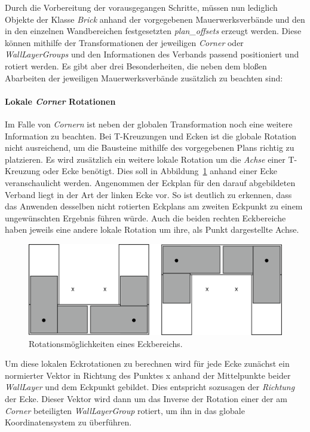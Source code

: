 Durch die Vorbereitung der vorausgegangen Schritte, müssen nun lediglich Objekte der Klasse \textit{Brick} anhand der vorgegebenen Mauerwerksverbände und den in den einzelnen Wandbereichen festgesetzten \textit{plan\_offsets} erzeugt werden.
Diese können mithilfe der Transformationen der jeweiligen \textit{Corner} oder \textit{WallLayerGroups} und den Informationen des Verbands passend positioniert und rotiert werden.
Es gibt aber drei Besonderheiten, die neben dem bloßen Abarbeiten der jeweiligen Mauerwerksverbände zusätzlich zu beachten sind:

\paragraph*{Lokale \textit{Corner} Rotationen}
Im Falle von \textit{Cornern} ist neben der globalen Transformation noch eine weitere Information zu beachten.
Bei T-Kreuzungen und Ecken ist die globale Rotation nicht ausreichend, um die Bausteine mithilfe des vorgegebenen Plans richtig zu platzieren.
Es wird zusätzlich ein weitere lokale Rotation um die \textit{Achse} einer T-Kreuzung oder Ecke benötigt.
Dies soll in Abbildung~\ref{fig:real:eckrotationen} anhand einer Ecke veranschaulicht werden.
Angenommen der Eckplan für den darauf abgebildeten Verband liegt in der Art der linken Ecke vor.
So ist deutlich zu erkennen, dass das Anwenden desselben nicht rotierten Eckplans am zweiten Eckpunkt zu einem ungewünschten Ergebnis führen würde.
Auch die beiden rechten Eckbereiche haben jeweils eine andere lokale Rotation um ihre, als Punkt dargestellte Achse.
\begin{figure}[hb]
  \centering
  \includegraphics[width=0.9\columnwidth]{fig/Eckrotationen.png}
  \caption{Rotationsmöglichkeiten eines Eckbereichs.}\label{fig:real:eckrotationen}
\end{figure}
Um diese lokalen Eckrotationen zu berechnen wird für jede Ecke zunächst ein normierter Vektor in Richtung des Punktes x anhand der Mittelpunkte beider \textit{WallLayer} und dem Eckpunkt gebildet.
Dies entspricht sozusagen der \textit{Richtung} der Ecke.
Dieser Vektor wird dann um das Inverse der Rotation einer der am \textit{Corner} beteiligten \textit{WallLayerGroup} rotiert, um ihn in das globale Koordinatensystem zu überführen.
